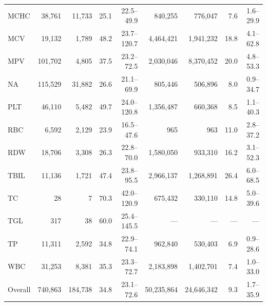 \begin{table}[ht]
\begin{tabular}{lrrrrrrrr}
MCHC & 38,761 & 11,733 & 25.1 & 22.5--49.9 & 840,255 & 776,047 & 7.6 & 1.6--29.9 \\
MCV & 19,132 & 1,789 & 48.2 & 23.7--120.7 & 4,464,421 & 1,941,232 & 18.8 & 4.1--62.8 \\
MPV & 101,702 & 4,805 & 37.5 & 23.2--72.5 & 2,030,046 & 8,370,452 & 20.0 & 4.8--53.3 \\
NA & 115,529 & 31,882 & 26.6 & 21.1--69.9 & 805,446 & 506,896 & 8.0 & 0.9--34.7 \\
PLT & 46,110 & 5,482 & 49.7 & 24.0--120.8 & 1,356,487 & 660,368 & 8.5 & 1.1--40.3 \\
RBC & 6,592 & 2,129 & 23.9 & 16.5--47.6 & 965 & 963 & 11.0 & 2.8--37.2 \\
RDW & 18,706 & 3,308 & 26.3 & 22.8--70.0 & 1,580,050 & 933,310 & 16.2 & 3.1--52.3 \\
TBIL & 11,136 & 1,721 & 47.4 & 23.8--95.5 & 2,966,137 & 1,268,891 & 26.4 & 6.0--68.5 \\
TC & 28 & 7 & 70.3 & 42.0--120.9 & 675,432 & 330,110 & 14.8 & 5.0--39.6 \\
TGL & 317 & 38 & 60.0 & 25.4--145.5 & --- & --- & --- & --- \\
TP & 11,311 & 2,592 & 34.8 & 22.9--74.1 & 962,840 & 530,403 & 6.9 & 0.9--28.6 \\
WBC & 31,253 & 8,381 & 35.3 & 23.3--72.7 & 2,183,898 & 1,402,701 & 7.4 & 1.0--33.0 \\
Overall & 740,863 & 184,738 & 34.8 & 23.1--72.6 & 50,235,864 & 24,646,342 & 9.3 & 1.7--35.9 \\
\bottomrule
\end{tabular}
\label{tab:lead_time}
\end{table}
